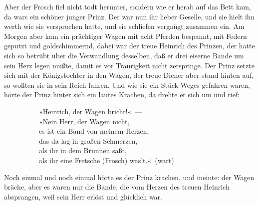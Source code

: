 Aber der Frosch fiel nicht todt herunter, sondern wie er herab auf das Bett kam, da wars ein schöner junger Prinz. Der war nun ihr lieber Geselle, und sie hielt ihn werth wie sie versprochen hatte, und sie schliefen vergnügt zusammen ein. Am Morgen aber kam ein prächtiger Wagen mit acht Pferden bespannt, mit Federn geputzt und goldschimmernd, dabei war der treue Heinrich des Prinzen, der hatte sich so betrübt über die Verwandlung desselben, daß er drei eiserne Bande um sein Herz legen mußte, damit es vor Traurigkeit nicht zerspringe. Der Prinz setzte sich mit der Königstochter in den Wagen, der treue Diener aber stand hinten auf, so wollten sie in sein Reich fahren. Und wie sie ein Stück Weges gefahren waren, hörte der Prinz hinter sich ein lautes Krachen, da drehte er sich um und rief:

          »Heinrich, der Wagen bricht!« —\\
          »Nein Herr, der Wagen nicht,\\
          es ist ein Band von meinem Herzen,\\
          das da lag in großen Schmerzen,\\
          als ihr in dem Brunnen saßt,\\
          als ihr eine Fretsche (Frosch) was’t.« (wart)

Noch einmal und noch einmal hörte es der Prinz krachen, und meinte: der Wagen bräche, aber es waren nur die Bande, die vom Herzen des treuen Heinrich absprangen, weil sein Herr erlöst und glücklich war.



\endinput
